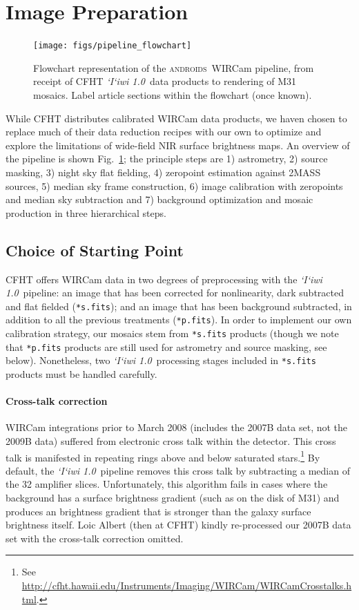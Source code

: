 \documentclass[iop]{emulateapj}
\newcommand{\sw}[1]{\textit{#1}} %
\newcommand{\iiwione}{\sw{`I`iwi 1.0}}
\newcommand{\androids}{\textsc{androids}}
\newcommand{\todo}[1]{\textcolor{BurntOrange}{\textsf{#1}}} %
\newcommand{\Fig}[1]{Fig.~\ref{fig:#1}}  %
\begin{document}
\section{Image Preparation}
\label{sec:reduction}

\begin{figure}[t]
\centering
\texttt{[image: figs/pipeline\_flowchart]}
\caption{Flowchart representation of the \androids\ WIRCam pipeline, from receipt of CFHT \iiwione\ data products to rendering of M31 mosaics.
\todo{Label article sections within the flowchart (once known).}}
\label{fig:flowchart}
\end{figure}

While CFHT distributes calibrated WIRCam data products, we haven chosen to replace much of their data reduction recipes with our own to optimize and explore the limitations of wide-field NIR surface brightness maps.
An overview of the pipeline is shown \Fig{flowchart}; the principle steps are 1) astrometry, 2) source masking, 3) night sky flat fielding, 4) zeropoint estimation against 2MASS sources, 5) median sky frame construction, 6) image calibration with zeropoints and median sky subtraction and 7) background optimization and mosaic production in three hierarchical steps.

\subsection{Choice of Starting Point}

CFHT offers WIRCam data in two degrees of preprocessing with the \iiwione\ pipeline: an image that has been corrected for nonlinearity, dark subtracted and flat fielded (\texttt{*s.fits}); and an image that has been background subtracted, in addition to all the previous treatments (\texttt{*p.fits}).
In order to implement our own calibration strategy, our mosaics stem from \texttt{*s.fits} products (though we note that \texttt{*p.fits} products are still used for astrometry and source masking, see below).
Nonetheless, two \iiwione\ processing stages included in \texttt{*s.fits} products must be handled carefully.

\paragraph{Cross-talk correction} WIRCam integrations prior to March 2008 (includes the 2007B data set, not the 2009B data) suffered from electronic cross talk within the detector.
This cross talk is manifested in repeating rings above and below saturated stars.\footnote{See \url{http://cfht.hawaii.edu/Instruments/Imaging/WIRCam/WIRCamCrosstalks.html}.}
By default, the \iiwione\ pipeline removes this cross talk by subtracting a median of the 32 amplifier slices.
Unfortunately, this algorithm fails in cases where the background has a surface brightness gradient (such as on the disk of M31) and produces an brightness gradient that is stronger than the galaxy surface brightness itself.
Loic Albert (then at CFHT) kindly re-processed our 2007B data set with the cross-talk correction omitted.
\end{document}
